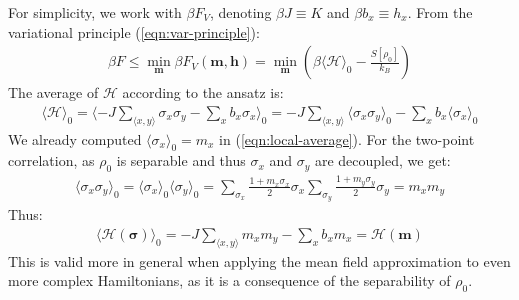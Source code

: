 \documentclass[../template.tex]{subfiles}
\begin{document}
For simplicity, we work with $\beta F_V$, denoting $\beta J \equiv K$ and $\beta b_x \equiv h_x$. From the variational principle (\ref{eqn:var-principle}):
\begin{align}
    \beta F \leq  
    \min_{\bm{m}} \beta F_V(\bm{m}, \bm{h}) = \min_{\bm{m}} \left(
      \beta \langle \mathcal{H} \rangle_0 -\frac{S[\rho_0]}{k_B} \right) 
      \label{eqn:ising-variational}
\end{align}
The average of $\mathcal{H}$ according to the ansatz is:
\begin{align*}
    \langle \mathcal{H} \rangle_0 = \langle -J \sum_{\langle x,y \rangle} \sigma_x \sigma_y - \sum_x b_x \sigma_x \rangle_0 = -J \sum_{\langle x,y \rangle} \langle \sigma_x \sigma_y \rangle_0 - \sum_x b_x \langle \sigma_x \rangle_0
\end{align*}
We already computed $\langle \sigma_x \rangle_0 = m_x$ in (\ref{eqn:local-average}). For the two-point correlation, as $\rho_0$ is separable and thus $\sigma_x$ and $\sigma_y$ are decoupled, we get:
\begin{align*}
    \langle \sigma_x \sigma_y \rangle_0 = \langle \sigma_x \rangle_0 \langle \sigma_y \rangle_0 = \sum_{\sigma_x} \frac{1+m_x \sigma_x}{2} \sigma_x \sum_{\sigma_y} \frac{1+m_y \sigma_y}{2} \sigma_y = m_x m_y
\end{align*}
Thus:
\begin{align}\label{eqn:H0avg}
    \langle \mathcal{H}(\bm{\sigma}) \rangle_0 = -J \sum_{\langle x,y \rangle} m_x m_y - \sum_x b_x m_x = \mathcal{H}(\bm{m})
\end{align}
This is valid more in general when applying the mean field approximation to even more complex Hamiltonians, as it is a consequence of the separability of $\rho_0$.

\medskip
\end{document}
